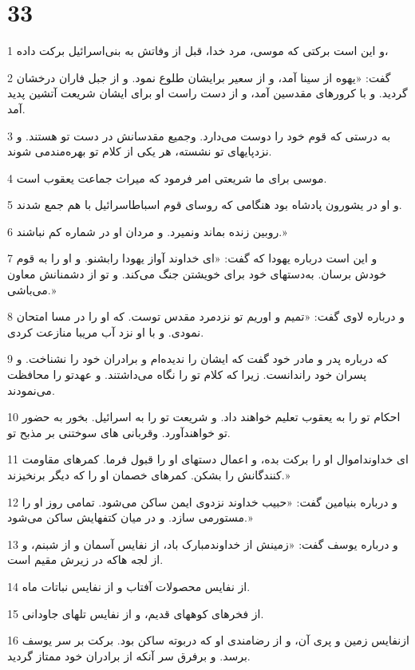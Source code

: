 \chapter{33}

\par 1 و این است برکتی که موسی، مرد خدا، قبل از وفاتش به بنی‌اسرائیل برکت داده،
\par 2 گفت: «یهوه از سینا آمد، و از سعیر برایشان طلوع نمود. و از جبل فاران درخشان گردید. و با کرورهای مقدسین آمد، و از دست راست او برای ایشان شریعت آتشین پدید آمد.
\par 3 به درستی که قوم خود را دوست می‌دارد. وجمیع مقدسانش در دست تو هستند. و نزدپایهای تو نشسته، هر یکی از کلام تو بهره‌مندمی شوند.
\par 4 موسی برای ما شریعتی امر فرمود که میراث جماعت یعقوب است.
\par 5 و او در یشورون پادشاه بود هنگامی که روسای قوم اسباطاسرائیل با هم جمع شدند.
\par 6 روبین زنده بماند ونمیرد. و مردان او در شماره کم نباشند.»
\par 7 و این است درباره یهودا که گفت: «ای خداوند آواز یهودا رابشنو. و او را به قوم خودش برسان. به‌دستهای خود برای خویشتن جنگ می‌کند. و تو از دشمنانش معاون می‌باشی.»
\par 8 و درباره لاوی گفت: «تمیم و اوریم تو نزدمرد مقدس توست. که او را در مسا امتحان نمودی. و با او نزد آب مریبا منازعت کردی.
\par 9 که درباره پدر و مادر خود گفت که ایشان را ندیده‌ام و برادران خود را نشناخت. و پسران خود راندانست. زیرا که کلام تو را نگاه می‌داشتند. و عهدتو را محافظت می‌نمودند.
\par 10 احکام تو را به یعقوب تعلیم خواهند داد. و شریعت تو را به اسرائیل. بخور به حضور تو خواهند‌آورد. وقربانی های سوختنی بر مذبح تو.
\par 11 ‌ای خداونداموال او را برکت بده، و اعمال دستهای او را قبول فرما. کمرهای مقاومت کنندگانش را بشکن. کمرهای خصمان او را که دیگر برنخیزند.»
\par 12 و درباره بنیامین گفت: «حبیب خداوند نزدوی ایمن ساکن می‌شود. تمامی روز او را مستورمی سازد. و در میان کتفهایش ساکن می‌شود.»
\par 13 و درباره یوسف گفت: «زمینش از خداوندمبارک باد، از نفایس آسمان و از شبنم، و از لجه هاکه در زیرش مقیم است.
\par 14 از نفایس محصولات آفتاب و از نفایس نباتات ماه.
\par 15 از فخرهای کوههای قدیم، و از نفایس تلهای جاودانی.
\par 16 ازنفایس زمین و پری آن، و از رضامندی او که دربوته ساکن بود. برکت بر سر یوسف برسد. و برفرق سر آنکه از برادران خود ممتاز گردید.
